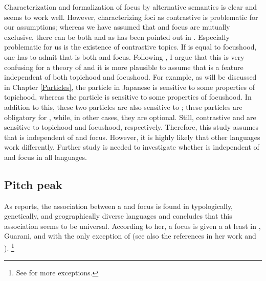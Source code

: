 Characterization and formalization of focus by alternative semantics is
clear and seems to work well.
However, characterizing foci as contrastive is problematic
for our assumptions;
whereas we have assumed that  and focus are mutually exclusive,
there can be both  and 
as has been pointed out in .
Especially problematic for us is the existence of contrastive topics.
If  is equal to focushood,
one has to admit that  is both  and focus.
Following ,
I argue that this is very confusing for a theory of  and
it is more plausible to assume that  is a feature independent of both topichood and focushood.
For example,
as will be discussed in Chapter \ref{Particles},
the particle  in Japanese is sensitive to some properties of topichood,
whereas the particle  is sensitive to some properties of focushood.
In addition to this,
these two particles are also sensitive to ;
these particles are obligatory for ,
while, in other cases, they are optional.
Still, contrastive  and  are sensitive to topichood and focushood, respectively.
Therefore, this study
assumes that
 is independent of  and focus.
However, it is highly likely that other languages work differently.
Further study is needed to investigate whether  is independent of  and focus in all languages.

%
%
\subsection{Pitch peak}

As  reports,
the association between a  and focus
is found in typologically, genetically, and geographically diverse languages
and concludes that this association seems to be universal.
According to her,
a focus is given a  at least in , Guarani,  and 
with the only exception of  (see also the references in her work and ).%
\footnote{
See  for more exceptions.
}

